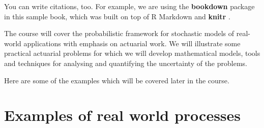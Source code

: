 \documentclass[
]{book}
\theoremstyle{definition}
\theoremstyle{definition}
\theoremstyle{definition}
\theoremstyle{definition}
\theoremstyle{remark}
\begin{document}
You can write citations, too. For example, we are using the \textbf{bookdown} package \citep{R-bookdown} in this sample book, which was built on top of R Markdown and \textbf{knitr} \citep{xie2015}.

The course will cover the probabilistic framework for stochastic models
of real-world applications with emphasis on actuarial work. We will
illustrate some practical actuarial problems for which we will develop
mathematical models, tools and techniques for analysing and quantifying
the uncertainty of the problems.

Here are some of the examples which will be covered later in the course.

\hypertarget{examples-of-real-world-processes}{%
\chapter{Examples of real world processes}\label{examples-of-real-world-processes}}
\end{document}
